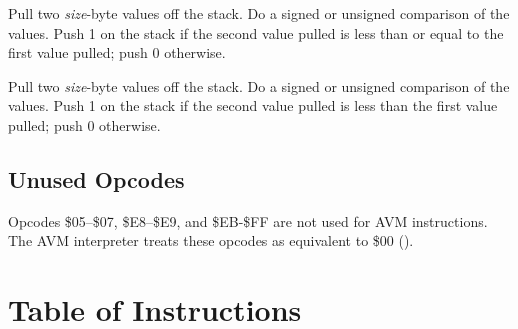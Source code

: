 \documentclass[10pt]{article}
\begin{document}
 Pull two
\emph{size}-byte values off the stack. Do a signed or unsigned
comparison of the values.  Push 1 on the stack if the second value
pulled is less than or equal to the first value pulled; push 0
otherwise.

 Pull two
\emph{size}-byte values off the stack. Do a signed or unsigned
comparison of the values.  Push 1 on the stack if the second value
pulled is less than the first value pulled; push 0 otherwise.

\subsection{Unused Opcodes}

Opcodes \$05--\$07, \$E8--\$E9, and \$EB-\$FF are not used for AVM
instructions.  The AVM interpreter treats these opcodes as equivalent
to \$00 ().

\newpage

\section{Table of Instructions}
\end{document}
